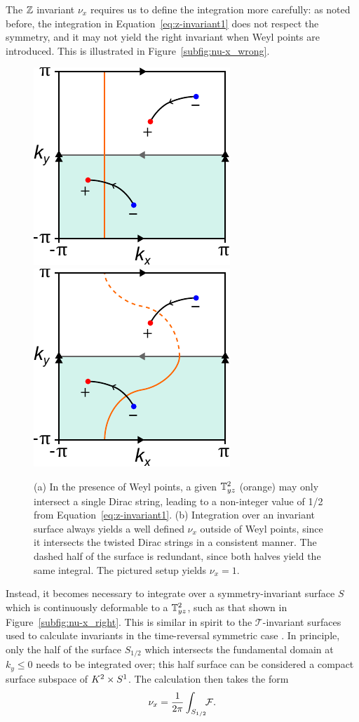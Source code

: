 The $\mathbb{Z}$ invariant $\nu_x$ requires us to define the integration more carefully: as noted before, the integration in Equation~\eqref{eq:z-invariant1} does not respect the symmetry, and it may not yield the right invariant when Weyl points are introduced. This is illustrated in Figure~\ref{subfig:nu-x_wrong}.
\begin{figure}[htb!]
	\centering
	\subcaptionbox{\label{subfig:nu-x_wrong}} {\includegraphics[width=.3\textwidth]{Images/nu-x_wrong}}
	\hfil
	\subcaptionbox{\label{subfig:nu-x_right}} {\includegraphics[width=.3\textwidth]{Images/nu-x_right}}
	\caption{(a) In the presence of Weyl points, a given $\mathbb{T}_{yz}^2$ (orange) may only intersect a single Dirac string, leading to a non-integer value of 1/2 from Equation~\eqref{eq:z-invariant1}. (b) Integration over an invariant surface always yields a well defined $\nu_x$ outside of Weyl points, since it intersects the twisted Dirac strings in a consistent manner. The dashed half of the surface is redundant, since both halves yield the same integral. The pictured setup yields $\nu_x=1$.}
	\label{fig:nu-x}
\end{figure}
Instead, it becomes necessary to integrate over a symmetry-invariant surface $S$ which is continuously deformable to a $\mathbb{T}_{yz}^2$, such as that shown in Figure~\ref{subfig:nu-x_right}. This is similar in spirit to the $\mathcal{T}$-invariant surfaces used to calculate invariants in the time-reversal symmetric case \cite{Thiang_equivariant}. In principle, only the half of the surface $S_{1/2}$ which intersects the fundamental domain at $k_y\leq 0$ needs to be integrated over; this half surface can be considered a compact surface subspace of $K^2\times S^1$. The calculation then takes the form
\begin{equation}\label{eq:z-invariant2}
	\nu_x = \frac{1}{2\pi}\int_{S_{1/2}}\!\!\mathcal{F}.
\end{equation}
